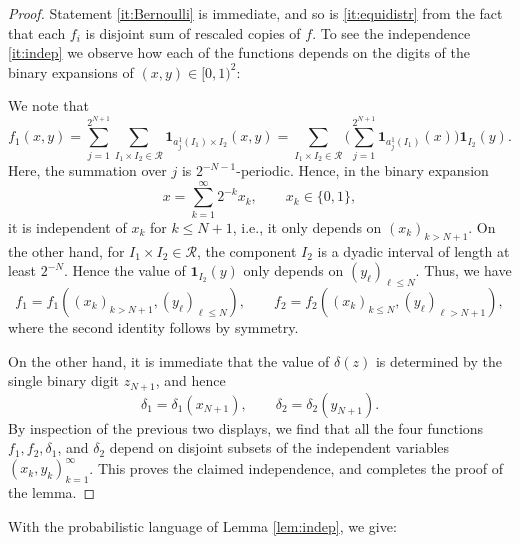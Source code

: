 \documentclass[11pt, reqno]{amsart}
\theoremstyle{definition}
\theoremstyle{remark}
\numberwithin{equation}{section}
\newcommand{\one}{\mathbf{1}}
\begin{document}
\begin{proof}
Statement \eqref{it:Bernoulli} is immediate, and so
is \eqref{it:equidistr} from the fact that each $f_i$ is disjoint sum of rescaled copies of $f$. To see the independence \eqref{it:indep} we observe how each of the functions depends on the digits of the binary expansions of $(x,y)\in[0,1)^2$:

We note that
\begin{equation*}
  f_1(x,y)
  =\sum_{j=1}^{2^{N+1}}\sum_{I_1\times I_2\in\mathscr R}\one_{a^1_j(I_1)\times I_2}(x,y)
  =\sum_{I_1\times I_2\in\mathscr R}\Big(\sum_{j=1}^{2^{N+1}} \one_{a^1_j(I_1)}(x)\Big)\one_{I_2}(y).
\end{equation*}
Here, the summation over $j$ is $2^{-N-1}$-periodic. Hence, in the binary expansion
\begin{equation*}
  x=\sum_{k=1}^\infty 2^{-k}x_k,\qquad x_k\in\{0,1\},
\end{equation*}
it is independent of $x_k$ for $k\leq N+1$, i.e., it only depends on $(x_k)_{k>N+1}$. On the other hand, for $I_1\times I_2\in\mathscr R$, the component $I_2$ is a dyadic interval of length at least $2^{-N}$. Hence the value of $\one_{I_2}(y)$ only depends on $(y_\ell)_{\ell\leq N}$. Thus, we have
\begin{equation*}
  f_1=f_1((x_k)_{k>N+1},(y_\ell)_{\ell\leq N}),\qquad
  f_2=f_2((x_k)_{k\leq N},(y_\ell)_{\ell>N+1}),
\end{equation*}
where the second identity follows by symmetry.

On the other hand, it is immediate that the value of $\delta(z)$ is determined by the single binary digit $z_{N+1}$, and hence
\begin{equation*}
  \delta_1=\delta_1(x_{N+1}),\qquad\delta_2=\delta_2(y_{N+1}).
\end{equation*}
By inspection of the previous two displays, we find that all the four functions $f_1,f_2,\delta_1$, and $\delta_2$ depend on disjoint subsets of the independent variables $(x_k,y_k)_{k=1}^\infty$. This proves the claimed independence, and completes the proof of the lemma.
\end{proof}

With the probabilistic language of Lemma \ref{lem:indep}, we give:
\end{document}
